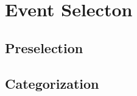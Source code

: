 \chapter{Event Selecton}\label{cha:event_selecton}

\section{Preselection}\label{sec:preselection}

\section{Categorization}\label{sec:categorization}
